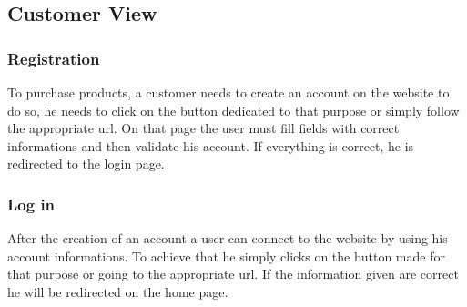 \documentclass{article}
\begin{document}
\subsection{Customer View}

\subsubsection{Registration}
To purchase products, a customer needs to create an account on the website to do so, he needs to click on the button dedicated to that purpose or simply follow the appropriate url. On that page the user must fill fields with correct informations and then validate his account. If everything is correct, he is redirected to the login page.
 
\subsubsection{Log in}
After the creation of an account a user can connect to the website by using his account informations. To achieve that he simply clicks on the button made for that purpose or going to the appropriate url. If the information given are correct he will be redirected on the home page.
 
\end{document}
